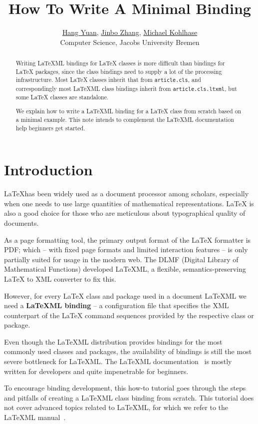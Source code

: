 \documentclass[a4paper]{article}
\title{\textbf{How To Write A Minimal \latexml Binding}}
\author{\href{mailto:h.yuan@jacobs-university.de}{Hang Yuan}, 
	\href{mailto:jin.zhang@jacobs-university.de}{Jinbo Zhang},
        \href{mailto:m.kohlhase@jacobs-university.de}{Michael Kohlhase}\\
        Computer Science, Jacobs University Bremen}
\def\latexml{{\LaTeX}ML\xspace}
\begin{document}
\maketitle
\begin{abstract}
  Writing \latexml bindings for {\LaTeX} classes is more difficult than bindings for
  {\LaTeX} packages, since the class bindings need to supply a lot of the processing
  infrastructure. Most {\LaTeX} classes inherit that from \lstinline|article.cls|, and
  correspondingly most \latexml class bindings inherit from \lstinline|article.cls.ltxml|,
  but some {\LaTeX} classes are standalone.

  We explain how to write a \latexml binding for a {\LaTeX} class from scratch based on a
  minimal example. This note intends to complement the \latexml documentation help
  beginners get started.
\end{abstract}
\tableofcontents\newpage

\section{Introduction}\label{sec:intro}

{\LaTeX}has been widely used as a document processor among scholars, especially when one
needs to use large quantities of mathematical representations. {\LaTeX} is also a good
choice for those who are meticulous about typographical quality of documents.

As a page formatting tool, the primary output format of the {\LaTeX} formatter is PDF;
which -- with fixed page formats and limited interaction features -- is only partially
suited for usage in the modern web. The DLMF (Digital Library of Mathematical Functions)
developed \latexml, a flexible, semantics-preserving {\LaTeX} to XML converter to fix
this.

However, for every {\LaTeX} class and package used in a document \latexml we need a
\textbf{\latexml binding} -- a configuration file that specifies the XML counterpart of
the {\LaTeX} command sequences provided by the respective class or package. 

Even though the \latexml distribution provides bindings for the most commonly used classes
and packages, the availability of bindings is still the most severe bottleneck for
\latexml. The \latexml documentation~\cite{LaTeXML:manual} is mostly written for developers and
quite impenetrable for beginners.

To encourage binding development, this how-to tutorial goes through the steps and pitfalls
of creating a \latexml class binding from scratch. This tutorial does not cover advanced
topics related to \latexml, for which we refer to the \latexml manual~\cite{LaTeXML:manual}.
\end{document}
